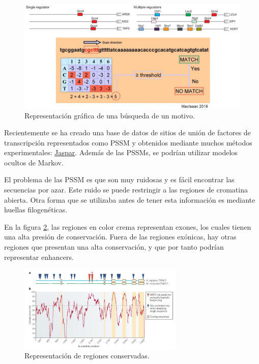 \begin{figure}[htbp]
\centering
\includegraphics[width = \textwidth]{figs/motif-location.png}
\caption{Representación gráfica de una búsqueda de un motivo.}
\label{fig:motif-location}
\end{figure}

Recientemente se ha creado una base de datos de sitios de unión de factores de transcripción representados como PSSM y obtenidos mediante muchos métodos experimentales: \href{https://jaspar.genereg.net/}{Jaspar}. Además de las PSSMs, se podrían utilizar modelos ocultos de Markov. 

El problema de las PSSM es que son muy ruidosas y es fácil encontrar las secuencias por azar. Este ruido se puede restringir a las regiones de cromatina abierta. Otra forma que se utilizaba antes de tener esta información es mediante huellas filogenéticas. 

En la figura \ref{fig:conservation}, las regiones en color crema representan exones, los cuales tienen una alta presión de conservación. Fuera de las regiones exónicas, hay otras regiones que presentan una alta conservación, y que por tanto podrían representar enhancers. 

\begin{figure}[htbp]
\centering
\includegraphics[width = 0.7\textwidth]{figs/noise-reduction.png}
\caption{Representación de regiones conservadas.}
\label{fig:conservation}
\end{figure}

